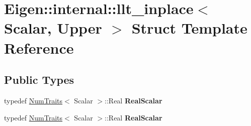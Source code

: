 \hypertarget{struct_eigen_1_1internal_1_1llt__inplace_3_01_scalar_00_01_upper_01_4}{}\section{Eigen\+:\+:internal\+:\+:llt\+\_\+inplace$<$ Scalar, Upper $>$ Struct Template Reference}
\label{struct_eigen_1_1internal_1_1llt__inplace_3_01_scalar_00_01_upper_01_4}
\subsection*{Public Types}
\begin{DoxyCompactItemize}
\item 
\mbox{\label{struct_eigen_1_1internal_1_1llt__inplace_3_01_scalar_00_01_upper_01_4_a5c0b84554aa27313036184c02fac2718}} 
typedef \hyperlink{group___core___module_struct_eigen_1_1_num_traits}{Num\+Traits}$<$ Scalar $>$\+::Real {\bfseries Real\+Scalar}
\item 
\mbox{\label{struct_eigen_1_1internal_1_1llt__inplace_3_01_scalar_00_01_upper_01_4_a5c0b84554aa27313036184c02fac2718}} 
typedef \hyperlink{group___core___module_struct_eigen_1_1_num_traits}{Num\+Traits}$<$ Scalar $>$\+::Real {\bfseries Real\+Scalar}
\end{DoxyCompactItemize}
